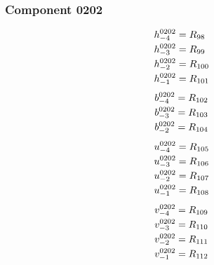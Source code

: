 \documentclass[11pt,a4paper]{article}
\begin{document}
\subsubsection{Component 0202}
\begin{equation}
\shortstack[l]{$\displaystyle h^{0202}_{-4}=R_{98}$\\
$\displaystyle h^{0202}_{-3}=R_{99}$\\
$\displaystyle h^{0202}_{-2}=R_{100}$\\
$\displaystyle h^{0202}_{-1}=R_{101}$}
\label{eq:cat-map-30}
\end{equation}
\begin{equation}
\shortstack[l]{$\displaystyle b^{0202}_{-4}=R_{102}$\\
$\displaystyle b^{0202}_{-3}=R_{103}$\\
$\displaystyle b^{0202}_{-2}=R_{104}$}
\label{eq:cat-map-31}
\end{equation}
\begin{equation}
\shortstack[l]{$\displaystyle u^{0202}_{-4}=R_{105}$\\
$\displaystyle u^{0202}_{-3}=R_{106}$\\
$\displaystyle u^{0202}_{-2}=R_{107}$\\
$\displaystyle u^{0202}_{-1}=R_{108}$}
\label{eq:cat-map-32}
\end{equation}
\begin{equation}
\shortstack[l]{$\displaystyle v^{0202}_{-4}=R_{109}$\\
$\displaystyle v^{0202}_{-3}=R_{110}$\\
$\displaystyle v^{0202}_{-2}=R_{111}$\\
$\displaystyle v^{0202}_{-1}=R_{112}$}
\label{eq:cat-map-33}
\end{equation}
\end{document}
